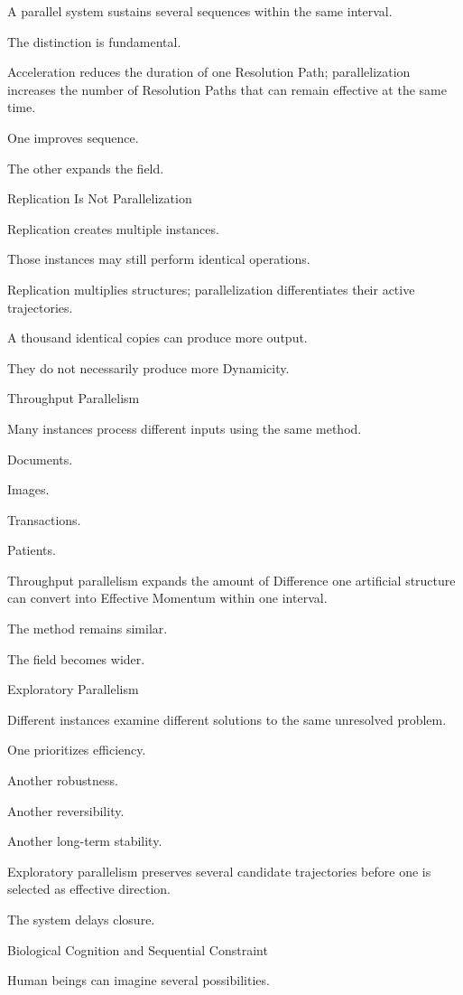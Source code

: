 A parallel system sustains several sequences within the same interval.

The distinction is fundamental.

Acceleration reduces the duration of one Resolution Path; parallelization increases the number of Resolution Paths that can remain effective at the same time.

One improves sequence.

The other expands the field.

Replication Is Not Parallelization

Replication creates multiple instances.

Those instances may still perform identical operations.

Replication multiplies structures; parallelization differentiates their active trajectories.

A thousand identical copies can produce more output.

They do not necessarily produce more Dynamicity.

Throughput Parallelism

Many instances process different inputs using the same method.

Documents.

Images.

Transactions.

Patients.

Throughput parallelism expands the amount of Difference one artificial structure can convert into Effective Momentum within one interval.

The method remains similar.

The field becomes wider.

Exploratory Parallelism

Different instances examine different solutions to the same unresolved problem.

One prioritizes efficiency.

Another robustness.

Another reversibility.

Another long-term stability.

Exploratory parallelism preserves several candidate trajectories before one is selected as effective direction.

The system delays closure.

Biological Cognition and Sequential Constraint

Human beings can imagine several possibilities.

